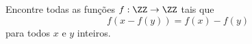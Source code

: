 Encontre todas as funções $f : \ZZ \to \ZZ$ tais que
$$f(x - f (y)) = f(x) - f(y)$$
para todos $x$ e $y$ inteiros.
